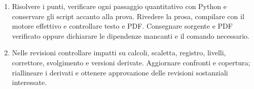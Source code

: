 \documentclass[a4paper,11pt]{article}
\begin{document}
\begin{enumerate}
\item Risolvere i punti, verificare ogni passaggio quantitativo con Python e conservare gli script accanto alla prova. Rivedere la prosa, compilare con il motore effettivo e controllare testo e PDF. Consegnare sorgente e PDF verificato oppure dichiarare le dipendenze mancanti e il comando necessario.
\item Nelle revisioni controllare impatti su calcoli, scaletta, registro, livelli, correttore, svolgimento e versioni derivate. Aggiornare confronti e copertura; riallineare i derivati e ottenere approvazione delle revisioni sostanziali interessate.
\end{enumerate}
\end{document}
